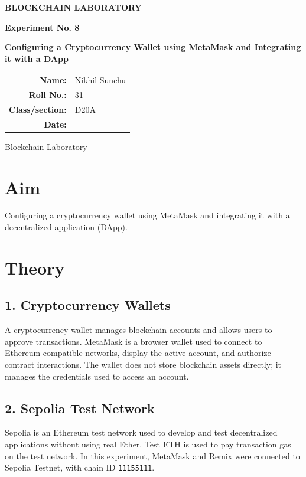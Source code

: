 \documentclass[12pt,a4paper]{article}
\begin{document}
\begin{titlepage}
\centering
\vspace*{1.5cm}
{\Large\bfseries BLOCKCHAIN LABORATORY\par}
\vspace{1.2cm}
{\large\bfseries Experiment No. 8\par}
\vspace{0.8cm}
{\LARGE\bfseries Configuring a Cryptocurrency Wallet using MetaMask and Integrating it with a DApp\par}
\vspace{1.5cm}
\begin{tabular}{rl}
\textbf{Name:} & Nikhil Sunchu \\[0.6cm]
\textbf{Roll No.:} & 31 \\[0.6cm]
\textbf{Class/section:} & D20A \\[0.6cm]
\textbf{Date:} \\[0.6cm]
\end{tabular}
\vfill
{\large Blockchain Laboratory\par}
\end{titlepage}

\section{Aim}
Configuring a cryptocurrency wallet using MetaMask and integrating it with a decentralized application (DApp).

\section{Theory}
\subsection{1. Cryptocurrency Wallets}
A cryptocurrency wallet manages blockchain accounts and allows users to approve transactions. MetaMask is a browser wallet used to connect to Ethereum-compatible networks, display the active account, and authorize contract interactions. The wallet does not store blockchain assets directly; it manages the credentials used to access an account.

\subsection{2. Sepolia Test Network}
Sepolia is an Ethereum test network used to develop and test decentralized applications without using real Ether. Test ETH is used to pay transaction gas on the test network. In this experiment, MetaMask and Remix were connected to Sepolia Testnet, with chain ID \texttt{11155111}.
\end{document}
